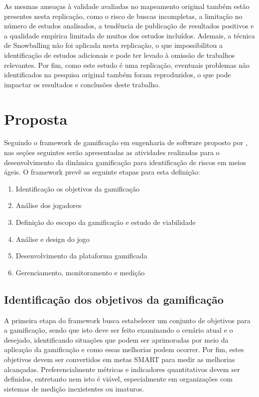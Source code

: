 \documentclass[
	12pt,
	openright,
	twoside,
	a4paper,
	english,
	brazil
	]{abntex2}
\begin{document}
As mesmas ameaças à validade avaliadas no mapeamento original também estão presentes nesta replicação, como o risco de buscas incompletas, a limitação no número de estudos analisados, a tendência de publicação de resultados positivos e a qualidade empírica limitada de muitos dos estudos incluídos. Ademais, a técnica de Snowballing não foi aplicada nesta replicação, o que impossibilitou a identificação de estudos adicionais e pode ter levado à omissão de trabalhos relevantes. Por fim, como este estudo é uma replicação, eventuais problemas não identificados na pesquisa original também foram reproduzidos, o que pode impactar os resultados e conclusões deste trabalho.



\chapter{Proposta}

Seguindo o framework de gamificação em engenharia de software proposto por , nas seções seguintes serão apresentadas as atividades realizadas para o desenvolvimento da dinâmica gamificação para identificação de riscos em meios ágeis. O framework prevê as seguinte etapas para esta definição:

\begin{enumerate}
  \item Identificação os objetivos da gamificação 
  \item Análise dos jogadores 
  \item Definição do escopo da gamificação e estudo de viabilidade 
  \item Análise e design do jogo 
  \item Desenvolvimento da plataforma gamificada 
  \item Gerenciamento, monitoramento e medição
\end{enumerate}

\section{Identificação dos objetivos da gamificação}

A primeira etapa do framework busca estabelecer um conjunto de objetivos para a gamificação, sendo que isto deve ser feito examinando o cenário atual e o desejado, identificando situações que podem ser aprimoradas por meio da aplicação da gamificação e como essas melhorias podem ocorrer. Por fim, estes objetivos devem ser convertidos em metas SMART para medir as melhorias alcançadas. Preferencialmente métricas e indicadores quantitativos devem ser definidos, entretanto nem isto é viável, especialmente em organizações com sistemas de medição inexistentes ou imaturos.
\end{document}

